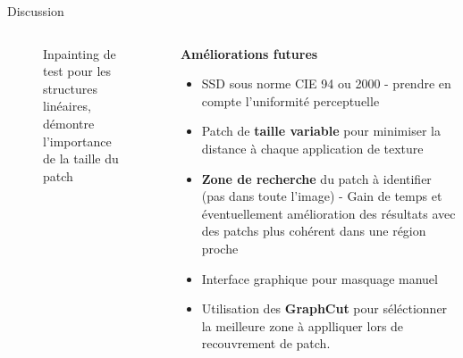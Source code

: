 \documentclass[final,hyperref={pdfpagelabels=false}]{beamer}
\begin{document}
\begin{frame}[t]
\begin{columns}[t]
\begin{column}{.930\textwidth}
\begin{block}{\Large Discussion}
\begin{columns}[t]
\begin{column}{.496\textwidth}
\begin{figure}[H]
\centering
{}
\caption{Inpainting de test pour les structures linéaires, démontre l'importance de la taille du patch}
\end{figure}

\end{column}
\begin{column}{.496\textwidth} 
\textbf{Améliorations futures}
\begin{itemize}
\item SSD sous norme CIE 94 ou 2000 - prendre en compte l'uniformité perceptuelle
\item Patch de \textbf{taille variable} pour minimiser la distance à chaque application de texture
\item \textbf{Zone de recherche} du patch à identifier (pas dans toute l'image) - Gain de temps et éventuellement amélioration des résultats avec des patchs plus cohérent dans une région proche
\item Interface graphique pour masquage manuel 
\item Utilisation des \textbf{GraphCut} pour séléctionner la meilleure zone à applliquer lors de recouvrement de patch. 
\end{itemize}


\end{column}
\end{columns}
\end{block}
\end{column}
\end{columns}
\end{frame}
\end{document}
